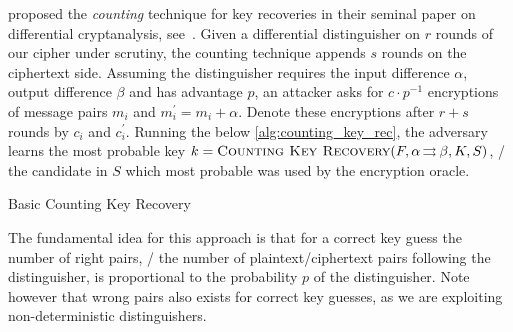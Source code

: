 \citeauthor{C:BihSha90} proposed the \emph{counting} technique for key recoveries in their seminal paper on differential cryptanalysis, see~\cite[End of Section~3]{C:BihSha90}.
Given a differential distinguisher on $r$ rounds of our cipher under scrutiny, the counting technique appends $s$ rounds on the ciphertext side.
Assuming the distinguisher requires the input difference $\alpha$, output difference $\beta$ and has advantage $p$, an attacker asks for $c \cdot p^{-1}$ encryptions of message pairs $m_i$ and $m_i^\prime = m_i + \alpha$.
Denote these encryptions after $r+s$ rounds by $c_i$ and $c_i^\prime$.
Running the below \cref{alg:counting_key_rec}, the adversary learns the most probable key $k = \textsc{Counting Key Recovery}(F, \alpha \operatorname*{\rightrightarrows}^{}_{} \beta, K, S)$, \ie/ the candidate in $S$ which most probable was used by the encryption oracle.
\begin{algorithm}
    \caption{Basic Counting Key Recovery}\label{alg:counting_key_rec}
\begin{algorithmic}[1]
    \Statex{}
                \label{line:cnt_key_rec:filter}
                \If{$\beta = \beta^\prime$}
                \EndIf{}
            \EndFor{}
        \EndFor{}
    \State{}
    \EndFunction{}
\end{algorithmic}
\end{algorithm}
The fundamental idea for this approach is that for a correct key guess the number of right pairs, \ie/ the number of plaintext/ciphertext pairs following the distinguisher, is proportional to the probability $p$ of the distinguisher.
Note however that wrong pairs also exists for correct key guesses, as we are exploiting non-deterministic distinguishers.

